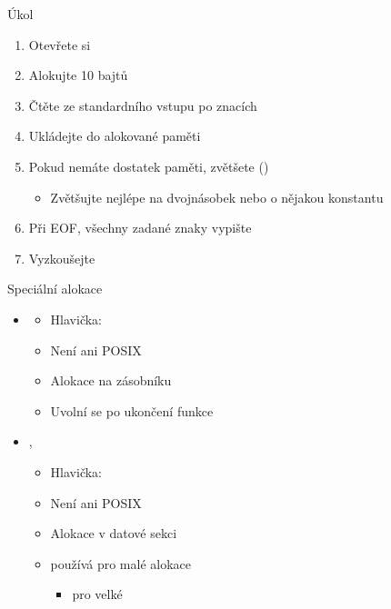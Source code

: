 \begin{frame}{Úkol}

  \begin{enumerate}
    \item Otevřete si 
    \item Alokujte 10 bajtů
    \item Čtěte ze standardního vstupu po znacích
    \item Ukládejte do alokované paměti
    \item Pokud nemáte dostatek paměti, zvětšete ()
    \begin{itemize}
      \item Zvětšujte nejlépe na dvojnásobek nebo o nějakou konstantu
    \end{itemize}

    \item Při EOF, všechny zadané znaky vypište
    \item Vyzkoušejte
  \end{enumerate}

\end{frame}

\begin{frame}{Speciální alokace}

  \begin{itemize}
    \item {}
    \begin{itemize}
      \item Hlavička: 
      \item Není ani POSIX
      \item Alokace na zásobníku
      \item Uvolní se po ukončení funkce
    \end{itemize}

    \pause

    \item {}, 
    \begin{itemize}
      \item Hlavička: 
      \item Není ani POSIX
      \item Alokace v datové sekci

      \pause

      \item {} používá pro malé alokace
      \begin{itemize}
	\item {} pro velké
      \end{itemize}
    \end{itemize}
  \end{itemize}

\end{frame}

